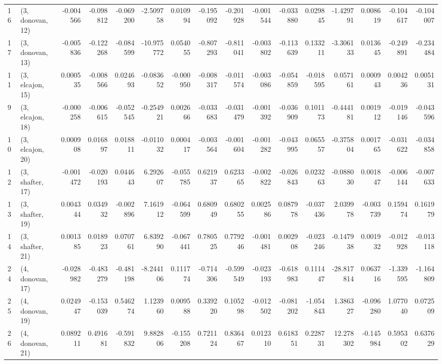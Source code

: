 \begin{tabular}{llrrrrrrrrrrrrrr}
16 &  (3, donovan, 12) &  -0.004566 & -0.098812 & -0.069200 &  -2.509758 &  0.010994 &  -0.195092 & -0.201928 & -0.001544 & -0.033880 &  0.029845 &  -1.429791 &  0.008619 & -0.104617 & -0.104007 \\
17 &  (3, donovan, 13) &  -0.005836 & -0.122268 & -0.084599 & -10.975772 &  0.054055 &  -0.807293 & -0.811041 & -0.003802 & -0.113639 &  0.133211 &  -3.306133 &  0.013645 & -0.249891 & -0.234484 \\
11 &  (3, elcajon, 15) &   0.000535 & -0.008566 &  0.024693 &  -0.083652 & -0.000950 &  -0.008317 & -0.011574 & -0.003086 & -0.054859 & -0.018595 &   0.057161 &  0.000943 &  0.004236 &  0.005131 \\
9  &  (3, elcajon, 18) &  -0.000258 & -0.006615 & -0.052545 &  -0.254921 &  0.002666 &  -0.033683 & -0.031479 & -0.001392 & -0.036909 &  0.101173 &  -0.444181 &  0.001912 & -0.019146 & -0.043596 \\
10 &  (3, elcajon, 20) &   0.000908 &  0.016897 &  0.018811 &  -0.011032 &  0.000417 &  -0.003564 & -0.001604 & -0.001282 & -0.043995 &  0.065557 &  -0.375804 &  0.001765 & -0.031622 & -0.034858 \\
12 &  (3, shafter, 17) &  -0.001472 & -0.020193 &  0.044643 &   6.292607 & -0.055785 &   0.621937 &  0.623365 & -0.002822 & -0.026843 &  0.023263 &  -0.088030 &  0.001847 & -0.006144 & -0.007633 \\
13 &  (3, shafter, 19) &   0.004344 &  0.034932 & -0.002896 &   7.161912 & -0.064599 &   0.680949 &  0.680255 &  0.002586 &  0.087978 & -0.037436 &   2.039978 & -0.003739 &  0.159474 &  0.161979 \\
14 &  (3, shafter, 21) &   0.001385 &  0.018923 &  0.070761 &   6.839290 & -0.067441 &   0.780525 &  0.779246 & -0.001481 &  0.002908 & -0.023246 &  -0.147938 &  0.001932 & -0.012928 & -0.013118 \\
24 &  (4, donovan, 17) &  -0.028982 & -0.483279 & -0.481198 &  -8.244106 &  0.111774 &  -0.714306 & -0.599549 & -0.023193 & -0.618983 &  0.111447 & -28.817814 &  0.063716 & -1.339595 & -1.164809 \\
25 &  (4, donovan, 19) &   0.024947 & -0.153039 &  0.546274 &   1.123960 &  0.009588 &   0.339220 &  0.105298 & -0.012502 & -0.081202 & -1.054843 &   1.386327 & -0.096280 &  1.077040 &  0.072509 \\
26 &  (4, donovan, 21) &   0.089211 &  0.491681 & -0.591832 &   9.882806 & -0.155208 &   0.721124 &  0.836467 &  0.012310 &  0.618351 &  0.228731 &  12.278302 & -0.145984 &  0.595302 &  0.637629 \\

\end{tabular}

